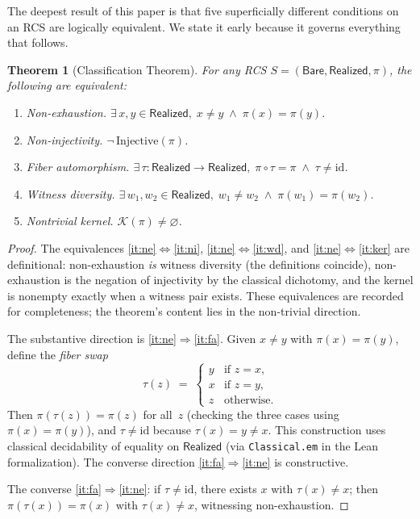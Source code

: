 \documentclass[11pt,a4paper]{article}
\theoremstyle{plain}
\newtheorem{theorem}{Theorem}[section]
\theoremstyle{definition}
\theoremstyle{remark}
\newcommand{\Bare}{\mathsf{Bare}}
\newcommand{\Real}{\mathsf{Realized}}
\newcommand{\compare}{\pi}
\newcommand{\Ker}{\mathcal{K}}
\begin{document}
The deepest result of this paper is that five superficially different conditions
on an RCS are logically equivalent. We state it early because it governs
everything that follows.

\begin{theorem}[Classification Theorem]\label{thm:fund-equiv}
For any RCS $S = (\Bare, \Real, \compare)$, the following are equivalent:
\begin{enumerate}[label=(\roman*)]
\item\label{it:ne} \emph{Non-exhaustion.}
      $\exists\, x, y \in \Real,\; x \neq y \;\land\; \compare(x) = \compare(y)$.
\item\label{it:ni} \emph{Non-injectivity.}
      $\lnot\,\mathrm{Injective}(\compare)$.
\item\label{it:fa} \emph{Fiber automorphism.}
      $\exists\, \tau : \Real \to \Real,\;
      \compare \circ \tau = \compare \;\land\; \tau \neq \mathrm{id}$.
\item\label{it:wd} \emph{Witness diversity.}
      $\exists\, w_1, w_2 \in \Real,\; w_1 \neq w_2 \;\land\;
      \compare(w_1) = \compare(w_2)$.
\item\label{it:ker} \emph{Nontrivial kernel.}
      $\Ker(\compare) \neq \varnothing$.
\end{enumerate}
\end{theorem}

\begin{proof}
The equivalences \ref{it:ne}$\Leftrightarrow$\ref{it:ni},
\ref{it:ne}$\Leftrightarrow$\ref{it:wd}, and
\ref{it:ne}$\Leftrightarrow$\ref{it:ker} are definitional: non-exhaustion
\emph{is} witness diversity (the definitions coincide), non-exhaustion is the
negation of injectivity by the classical dichotomy, and the kernel is nonempty
exactly when a witness pair exists. These equivalences are recorded for
completeness; the theorem's content lies in the non-trivial direction.

The substantive direction is \ref{it:ne}$\Rightarrow$\ref{it:fa}. Given
$x \neq y$ with $\compare(x) = \compare(y)$, define the \emph{fiber swap}
\[
  \tau(z) \;=\; \begin{cases}
    y & \text{if } z = x, \\
    x & \text{if } z = y, \\
    z & \text{otherwise.}
  \end{cases}
\]
Then $\compare(\tau(z)) = \compare(z)$ for all~$z$ (checking the three cases
using $\compare(x) = \compare(y)$), and $\tau \neq \mathrm{id}$ because
$\tau(x) = y \neq x$. This construction uses classical decidability of equality
on $\Real$ (via \texttt{Classical.em} in the Lean formalization). The converse
direction \ref{it:fa}$\Rightarrow$\ref{it:ne} is constructive.

The converse \ref{it:fa}$\Rightarrow$\ref{it:ne}: if $\tau \neq \mathrm{id}$,
there exists $x$ with $\tau(x) \neq x$; then $\compare(\tau(x)) = \compare(x)$
with $\tau(x) \neq x$, witnessing non-exhaustion.
\end{proof}
\end{document}
